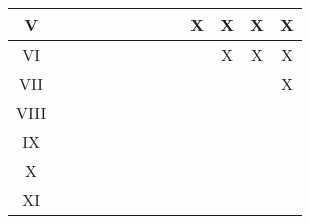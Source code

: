 \begin{quadro}[ht]
\begin{tabular}{|ccccccccccccc|}
\hline
\multicolumn{1}{|c|}{V}         & \multicolumn{1}{c|}{}    & \multicolumn{1}{c|}{}    & \multicolumn{1}{c|}{}    & \multicolumn{1}{c|}{}    & \multicolumn{1}{c|}{}    & \multicolumn{1}{c|}{}    & \multicolumn{1}{c|}{}    & \multicolumn{1}{c|}{}    & \multicolumn{1}{c|}{X}    & \multicolumn{1}{c|}{X}    & \multicolumn{1}{c|}{X}    &   \multicolumn{1}{c|}{X} \\
\hline
\multicolumn{1}{|c|}{VI}        & \multicolumn{1}{c|}{}    & \multicolumn{1}{c|}{}    & \multicolumn{1}{c|}{}    & \multicolumn{1}{c|}{}    & \multicolumn{1}{c|}{}    & \multicolumn{1}{c|}{}    & \multicolumn{1}{c|}{}    & \multicolumn{1}{c|}{}    & \multicolumn{1}{c|}{}    & \multicolumn{1}{c|}{X}    & \multicolumn{1}{c|}{X}    &   \multicolumn{1}{c|}{X}  \\ 
\hline
\multicolumn{1}{|c|}{VII}       & \multicolumn{1}{c|}{}    & \multicolumn{1}{c|}{}    & \multicolumn{1}{c|}{}    & \multicolumn{1}{c|}{}    & \multicolumn{1}{c|}{}    & \multicolumn{1}{c|}{}    & \multicolumn{1}{c|}{}    & \multicolumn{1}{c|}{}    & \multicolumn{1}{c|}{}    & \multicolumn{1}{c|}{}    & \multicolumn{1}{c|}{}    &   \multicolumn{1}{c|}{X}  \\ 
\hline
\multicolumn{1}{|c|}{VIII}      & \multicolumn{1}{c|}{}    & \multicolumn{1}{c|}{}    & \multicolumn{1}{c|}{}    & \multicolumn{1}{c|}{}    & \multicolumn{1}{c|}{}    & \multicolumn{1}{c|}{}    & \multicolumn{1}{c|}{}    & \multicolumn{1}{c|}{}    & \multicolumn{1}{c|}{}    & \multicolumn{1}{c|}{}    & \multicolumn{1}{c|}{}    &   \multicolumn{1}{c|}{}  \\ 
\hline
\multicolumn{1}{|c|}{IX}        & \multicolumn{1}{c|}{}    & \multicolumn{1}{c|}{}    & \multicolumn{1}{c|}{}    & \multicolumn{1}{c|}{}    & \multicolumn{1}{c|}{}    & \multicolumn{1}{c|}{}    & \multicolumn{1}{c|}{}    & \multicolumn{1}{c|}{}    & \multicolumn{1}{c|}{}    & \multicolumn{1}{c|}{}    & \multicolumn{1}{c|}{}    &  \multicolumn{1}{c|}{}   \\ 
\hline
\multicolumn{1}{|c|}{X}         & \multicolumn{1}{c|}{}    & \multicolumn{1}{c|}{}    & \multicolumn{1}{c|}{}    & \multicolumn{1}{c|}{}    & \multicolumn{1}{c|}{}    & \multicolumn{1}{c|}{}    & \multicolumn{1}{c|}{}    & \multicolumn{1}{c|}{}    & \multicolumn{1}{c|}{}    & \multicolumn{1}{c|}{}    & \multicolumn{1}{c|}{}    &   \multicolumn{1}{c|}{}  \\ 
\hline
\multicolumn{1}{|c|}{XI}        & \multicolumn{1}{c|}{}    & \multicolumn{1}{c|}{}    & \multicolumn{1}{c|}{}    & \multicolumn{1}{c|}{}    & \multicolumn{1}{c|}{}    & \multicolumn{1}{c|}{}    & \multicolumn{1}{c|}{}    & \multicolumn{1}{c|}{}    & \multicolumn{1}{c|}{}    & \multicolumn{1}{c|}{}    & \multicolumn{1}{c|}{}    &   \multicolumn{1}{c|}{}  \\ 

\end{tabular}
\end{quadro}
